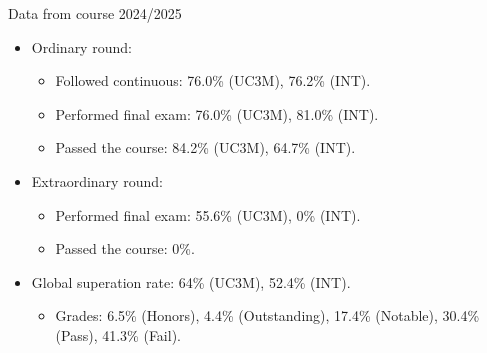 \begin{frame}[t]{Data from course 2024/2025}
\begin{itemize}
  \item Ordinary round:
    \begin{itemize}
      \item Followed continuous: 76.0\% (UC3M), 76.2\% (INT).
      \item Performed final exam: 76.0\% (UC3M), 81.0\% (INT).
      \item Passed the course: 84.2\% (UC3M), 64.7\% (INT).
    \end{itemize}

  \item Extraordinary round:
    \begin{itemize}
      \item Performed final exam: 55.6\% (UC3M), 0\% (INT).
      \item Passed the course: 0\%.
    \end{itemize}

  \item Global superation rate: 64\% (UC3M), 52.4\% (INT).
    \begin{itemize}
      \item Grades: 6.5\% (Honors), 4.4\% (Outstanding), 17.4\% (Notable),
30.4\% (Pass), 41.3\% (Fail).
    \end{itemize}
\end{itemize}
\end{frame}
